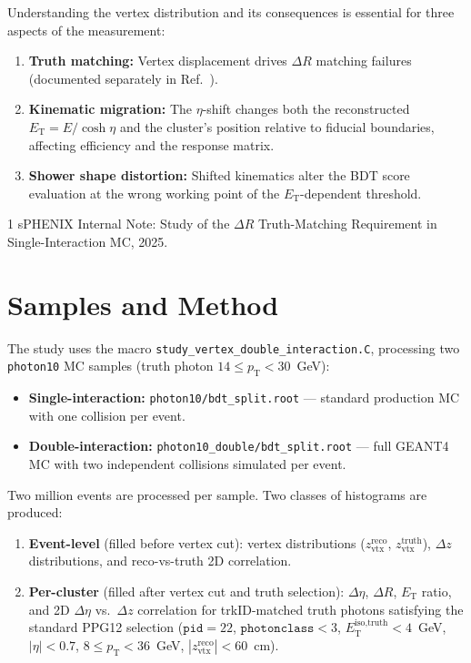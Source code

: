 \documentclass[11pt,letterpaper]{article}
\newcommand{\DR}{\ensuremath{\Delta R}}
\newcommand{\pT}{\ensuremath{p_{\text{T}}}}
\newcommand{\ET}{\ensuremath{E_{\text{T}}}}
\newcommand{\abseta}{\ensuremath{|\eta|}}
\newcommand{\isoETtruth}{\ensuremath{E_\text{T}^\text{iso,truth}}}
\begin{document}
Understanding the vertex distribution and its consequences is essential
for three aspects of the measurement:
\begin{enumerate}
  \item \textbf{Truth matching:} Vertex displacement drives $\DR$
    matching failures (documented separately in Ref.~\cite{dr_note}).
  \item \textbf{Kinematic migration:} The $\eta$-shift changes both the
    reconstructed $\ET = E / \cosh\eta$ and the cluster's position relative
    to fiducial boundaries, affecting efficiency and the response matrix.
  \item \textbf{Shower shape distortion:} Shifted kinematics alter the
    BDT score evaluation at the wrong working point of the
    $\ET$-dependent threshold.
\end{enumerate}

\begin{thebibliography}{1}
 sPHENIX Internal Note: Study of the $\DR$
  Truth-Matching Requirement in Single-Interaction MC, 2025.
\end{thebibliography}

\section{Samples and Method}
\label{sec:method}

The study uses the macro \texttt{study\_vertex\_double\_interaction.C},
processing two \texttt{photon10} MC samples (truth photon
$14 \leq \pT < 30$~GeV):
\begin{itemize}
  \item \textbf{Single-interaction:}
    \texttt{photon10/bdt\_split.root} --- standard production MC with
    one collision per event.
  \item \textbf{Double-interaction:}
    \texttt{photon10\_double/bdt\_split.root} --- full GEANT4 MC with
    two independent collisions simulated per event.
\end{itemize}

Two million events are processed per sample. Two classes of histograms
are produced:
\begin{enumerate}
  \item \textbf{Event-level} (filled before vertex cut): vertex
    distributions ($z_{\text{vtx}}^{\text{reco}}$,
    $z_{\text{vtx}}^{\text{truth}}$), $\Delta z$ distributions,
    and reco-vs-truth 2D correlation.
  \item \textbf{Per-cluster} (filled after vertex cut and truth
    selection): $\Delta\eta$, $\DR$, $\ET$ ratio, and 2D
    $\Delta\eta$ vs.\ $\Delta z$ correlation for trkID-matched
    truth photons satisfying the standard PPG12 selection
    ($\texttt{pid} = 22$, $\texttt{photonclass} < 3$,
    $\isoETtruth < 4$~GeV, $\abseta < 0.7$,
    $8 \leq \pT < 36$~GeV, $|z_{\text{vtx}}^{\text{reco}}| < 60$~cm).
\end{enumerate}
\end{document}
